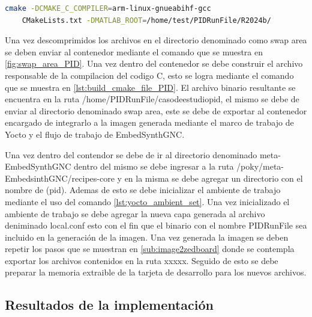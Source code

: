\begin{lstlisting}[language=bash, caption={Compilacion del programa , Linux}, label=lst:build_cmake_file_PID]
    cmake -DCMAKE_C_COMPILER=arm-linux-gnueabihf-gcc 
    CMakeLists.txt -DMATLAB_ROOT=/home/test/PIDRunFile/R2024b/
\end{lstlisting}

Una vez descomprimidos los archivos en el directorio denominado como swap area se deben enviar al contenedor mediante el comando que se muestra en \ref{fig:swap_area_PID}. Una vez dentro del contenedor se debe construir el archivo responsable de la compilacion del codigo C, esto se logra mediante el comando que se muestra en \ref{lst:build_cmake_file_PID}. El archivo binario resultante se encuentra en la ruta /home/PIDRunFile/casodeestudiopid, el mismo se debe de enviar al directorio denominado swap area, este se debe de exportar al contenedor encargado de integrarlo a la imagen generada mediante el marco de trabajo de Yocto y el flujo de trabajo de EmbedSynthGNC. 


Una vez dentro del contendor se debe de ir al directorio denominado meta-EmbedSynthGNC dentro del mismo se debe ingresar a la ruta /poky/meta-EmbedsinthGNC/recipes-core y en la misma se debe agregar un directorio con el nombre de (pid). Ademas de esto se debe inicializar el ambiente de trabajo mediante el uso del comando \ref{lst:yocto_ambient_set}. Una vez inicializado el ambiente de trabajo se debe agregar la nueva capa generada al archivo deniminado local.conf esto con el fin que el binario con el nombre PIDRunFile sea incluido en la generación de la imagen. Una vez generada la imagen se deben repetir los pasos que se muestran en \ref{sub:image2zedboard} donde se contempla exportar los archivos contenidos en la ruta xxxxx. Seguido de esto se debe preparar la memoria extraible de la tarjeta de desarrollo para los nuevos archivos.


\subsection{Resultados de la implementación}

